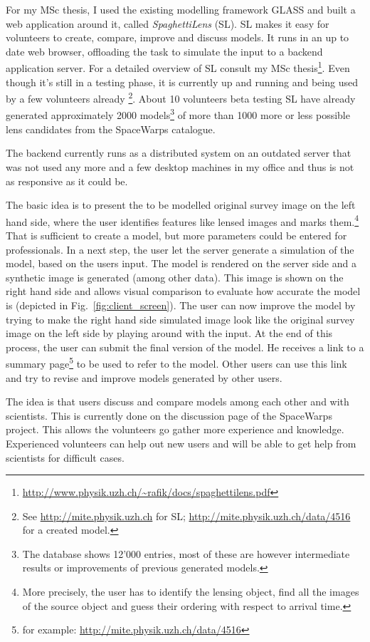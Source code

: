 \documentclass[11pt]{article}
\begin{document}
For my MSc thesis\cite{mscth}, I used the existing modelling framework GLASS\cite{glass} and built a web application around it, called \emph{SpaghettiLens} (SL).
SL makes it easy for volunteers to create, compare, improve and discuss models.
It runs in an up to date web browser, offloading the task to simulate the input to a backend application server.
For a detailed overview of SL consult my MSc thesis\footnote{\url{http://www.physik.uzh.ch/~rafik/docs/spaghettilens.pdf}}.
Even though it's still in a testing phase, it is currently up and running and being used by a few volunteers already
\footnote{See \url{http://mite.physik.uzh.ch} for SL; \url{http://mite.physik.uzh.ch/data/4516} for a created model.}.
About 10 volunteers beta testing SL have already generated approximately 2000 models\footnote{The database shows 12'000 entries, most of these are however intermediate results or improvements of previous generated models.} of more than 1000 more or less possible lens candidates from the SpaceWarps catalogue.

The backend currently runs as a distributed system on an outdated server that was not used any more and a few desktop machines in my office and thus is not as responsive as it could be.

The basic idea is to present the to be modelled original survey image on the left hand side, where the user identifies features like lensed images and marks them.\footnote{More precisely, the user has to identify the lensing object, find all the images of the source object and guess their ordering with respect to arrival time.}
That is sufficient to create a model, but more parameters could be entered for professionals.
In a next step, the user let the server generate a simulation of the model, based on the users input.
The model is rendered on the server side and a synthetic image is generated (among other data).
This image is shown on the right hand side and allows visual comparison to evaluate how accurate the model is (depicted in Fig.~\ref{fig:client_screen}).
The user can now improve the model by trying to make the right hand side simulated image look like the original survey image on the left side by playing around with the input.
At the end of this process, the user can submit the final version of the model.
He receives a link to a summary page\footnote{for example: \url{http://mite.physik.uzh.ch/data/4516}} to be used to refer to the model.
Other users can use this link and try to revise and improve models generated by other users.

The idea is that users discuss and compare models among each other and with scientists.
This is currently done on the discussion page of the SpaceWarps project.
This allows the volunteers go gather more experience and knowledge.
Experienced volunteers can help out new users and will be able to get help from scientists for difficult cases.
\end{document}
